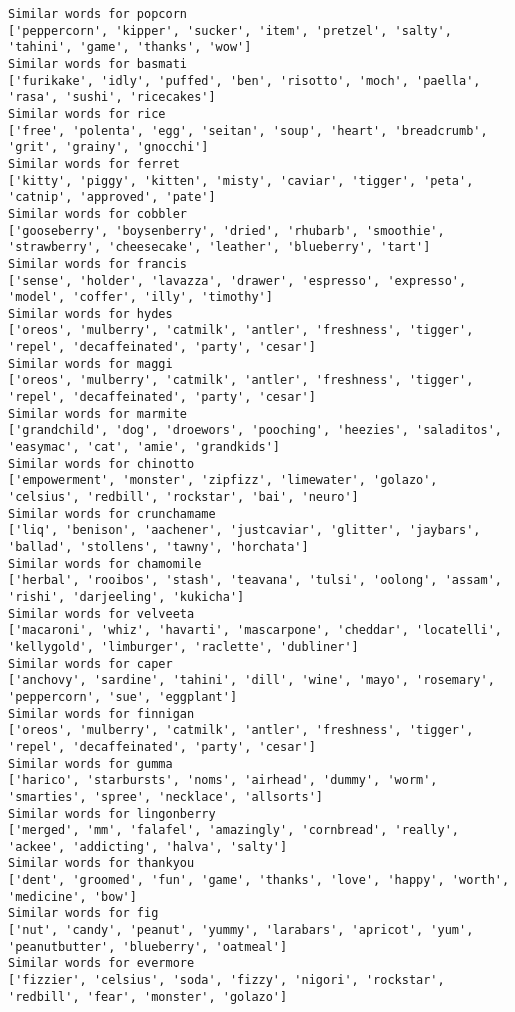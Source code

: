 \documentclass[11pt]{article}
\begin{document}
\begin{Verbatim}[commandchars=\\\{\}]
Similar words for popcorn
['peppercorn', 'kipper', 'sucker', 'item', 'pretzel', 'salty', 'tahini', 'game', 'thanks', 'wow']
Similar words for basmati
['furikake', 'idly', 'puffed', 'ben', 'risotto', 'moch', 'paella', 'rasa', 'sushi', 'ricecakes']
Similar words for rice
['free', 'polenta', 'egg', 'seitan', 'soup', 'heart', 'breadcrumb', 'grit', 'grainy', 'gnocchi']
Similar words for ferret
['kitty', 'piggy', 'kitten', 'misty', 'caviar', 'tigger', 'peta', 'catnip', 'approved', 'pate']
Similar words for cobbler
['gooseberry', 'boysenberry', 'dried', 'rhubarb', 'smoothie', 'strawberry', 'cheesecake', 'leather', 'blueberry', 'tart']
Similar words for francis
['sense', 'holder', 'lavazza', 'drawer', 'espresso', 'expresso', 'model', 'coffer', 'illy', 'timothy']
Similar words for hydes
['oreos', 'mulberry', 'catmilk', 'antler', 'freshness', 'tigger', 'repel', 'decaffeinated', 'party', 'cesar']
Similar words for maggi
['oreos', 'mulberry', 'catmilk', 'antler', 'freshness', 'tigger', 'repel', 'decaffeinated', 'party', 'cesar']
Similar words for marmite
['grandchild', 'dog', 'droewors', 'pooching', 'heezies', 'saladitos', 'easymac', 'cat', 'amie', 'grandkids']
Similar words for chinotto
['empowerment', 'monster', 'zipfizz', 'limewater', 'golazo', 'celsius', 'redbill', 'rockstar', 'bai', 'neuro']
Similar words for crunchamame
['liq', 'benison', 'aachener', 'justcaviar', 'glitter', 'jaybars', 'ballad', 'stollens', 'tawny', 'horchata']
Similar words for chamomile
['herbal', 'rooibos', 'stash', 'teavana', 'tulsi', 'oolong', 'assam', 'rishi', 'darjeeling', 'kukicha']
Similar words for velveeta
['macaroni', 'whiz', 'havarti', 'mascarpone', 'cheddar', 'locatelli', 'kellygold', 'limburger', 'raclette', 'dubliner']
Similar words for caper
['anchovy', 'sardine', 'tahini', 'dill', 'wine', 'mayo', 'rosemary', 'peppercorn', 'sue', 'eggplant']
Similar words for finnigan
['oreos', 'mulberry', 'catmilk', 'antler', 'freshness', 'tigger', 'repel', 'decaffeinated', 'party', 'cesar']
Similar words for gumma
['harico', 'starbursts', 'noms', 'airhead', 'dummy', 'worm', 'smarties', 'spree', 'necklace', 'allsorts']
Similar words for lingonberry
['merged', 'mm', 'falafel', 'amazingly', 'cornbread', 'really', 'ackee', 'addicting', 'halva', 'salty']
Similar words for thankyou
['dent', 'groomed', 'fun', 'game', 'thanks', 'love', 'happy', 'worth', 'medicine', 'bow']
Similar words for fig
['nut', 'candy', 'peanut', 'yummy', 'larabars', 'apricot', 'yum', 'peanutbutter', 'blueberry', 'oatmeal']
Similar words for evermore
['fizzier', 'celsius', 'soda', 'fizzy', 'nigori', 'rockstar', 'redbill', 'fear', 'monster', 'golazo']

\end{Verbatim}
\end{document}
